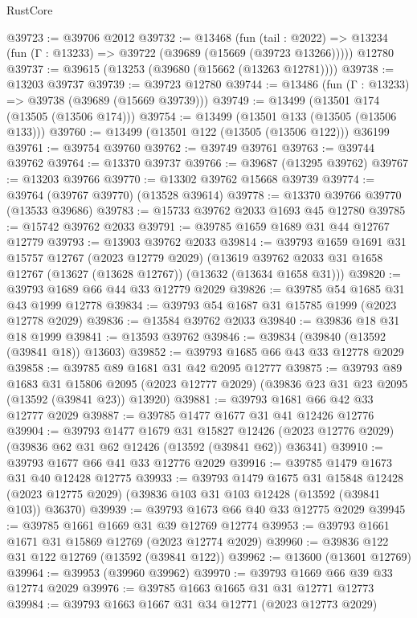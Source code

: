 \begin{lexlean}{RustCore}
\begin{coremodule}
@39723 := @39706 @2012
@39732 := @13468
    (fun (tail : @2022) => @13234 (fun (Γ : @13233) => @39722 (@39689 (@15669 (@39723 @13266)))))
    @12780
@39737 := @39615 (@13253 (@39680 (@15662 (@13263 @12781))))
@39738 := @13203 @39737
@39739 := @39723 @12780
@39744 := @13486 (fun (Γ : @13233) => @39738 (@39689 (@15669 @39739)))
@39749 := @13499 (@13501 @174 (@13505 (@13506 @174)))
@39754 := @13499 (@13501 @133 (@13505 (@13506 @133)))
@39760 := @13499 (@13501 @122 (@13505 (@13506 @122))) @36199
@39761 := @39754 @39760
@39762 := @39749 @39761
@39763 := @39744 @39762
@39764 := @13370 @39737
@39766 := @39687 (@13295 @39762)
@39767 := @13203 @39766
@39770 := @13302 @39762 @15668 @39739
@39774 := @39764 (@39767 @39770) (@13528 @39614)
@39778 := @13370 @39766 @39770 (@13533 @39686)
@39783 := @15733 @39762 @2033 @1693 @45 @12780
@39785 := @15742 @39762 @2033
@39791 := @39785 @1659 @1689 @31 @44 @12767 @12779
@39793 := @13903 @39762 @2033
@39814 := @39793
    @1659
    @1691
    @31
    @15757
    @12767
    (@2023 @12779 @2029)
    (@13619 @39762 @2033 @31 @1658 @12767 (@13627 (@13628 @12767)) (@13632 (@13634 @1658 @31)))
@39820 := @39793 @1689 @66 @44 @33 @12779 @2029
@39826 := @39785 @54 @1685 @31 @43 @1999 @12778
@39834 := @39793 @54 @1687 @31 @15785 @1999 (@2023 @12778 @2029)
@39836 := @13584 @39762 @2033
@39840 := @39836 @18 @31 @18 @1999
@39841 := @13593 @39762
@39846 := @39834 (@39840 (@13592 (@39841 @18)) @13603)
@39852 := @39793 @1685 @66 @43 @33 @12778 @2029
@39858 := @39785 @89 @1681 @31 @42 @2095 @12777
@39875 := @39793
    @89
    @1683
    @31
    @15806
    @2095
    (@2023 @12777 @2029)
    (@39836 @23 @31 @23 @2095 (@13592 (@39841 @23)) @13920)
@39881 := @39793 @1681 @66 @42 @33 @12777 @2029
@39887 := @39785 @1477 @1677 @31 @41 @12426 @12776
@39904 := @39793
    @1477
    @1679
    @31
    @15827
    @12426
    (@2023 @12776 @2029)
    (@39836 @62 @31 @62 @12426 (@13592 (@39841 @62)) @36341)
@39910 := @39793 @1677 @66 @41 @33 @12776 @2029
@39916 := @39785 @1479 @1673 @31 @40 @12428 @12775
@39933 := @39793
    @1479
    @1675
    @31
    @15848
    @12428
    (@2023 @12775 @2029)
    (@39836 @103 @31 @103 @12428 (@13592 (@39841 @103)) @36370)
@39939 := @39793 @1673 @66 @40 @33 @12775 @2029
@39945 := @39785 @1661 @1669 @31 @39 @12769 @12774
@39953 := @39793 @1661 @1671 @31 @15869 @12769 (@2023 @12774 @2029)
@39960 := @39836 @122 @31 @122 @12769 (@13592 (@39841 @122))
@39962 := @13600 (@13601 @12769)
@39964 := @39953 (@39960 @39962)
@39970 := @39793 @1669 @66 @39 @33 @12774 @2029
@39976 := @39785 @1663 @1665 @31 @31 @12771 @12773
@39984 := @39793 @1663 @1667 @31 @34 @12771 (@2023 @12773 @2029)

\end{coremodule}
\end{lexlean}
